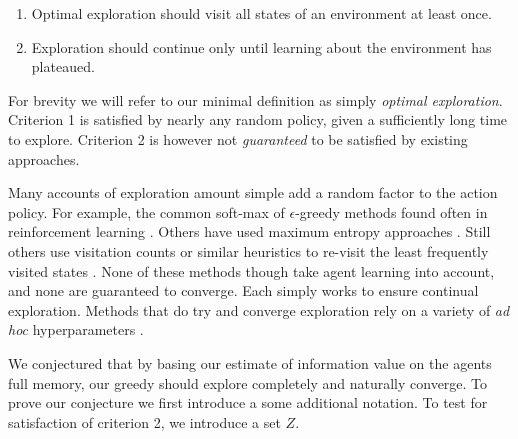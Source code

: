 \documentclass[9pt,twocolumn,twoside]{pnas-new}
\begin{document}
\begin{enumerate}[noitemsep,wide=0pt,leftmargin=\dimexpr\labelwidth+2\labelsep\relax]
    \item Optimal exploration should visit all states of an environment at least once. 
    \item Exploration should continue only until learning about the environment has plateaued. 
\end{enumerate}



For brevity we will refer to our minimal definition as simply \textit{optimal exploration}. Criterion 1 is satisfied by nearly any random policy, given a sufficiently long time to explore. Criterion 2 is however not \textit{guaranteed} to be satisfied by existing approaches.  

Many accounts of exploration amount simple add a random factor to the action policy. For example, the common soft-max of $\epsilon$-greedy methods found often in reinforcement learning \cite{Sutton2018a}. Others have used maximum entropy approaches \cite{Haarnoja2018,Haarnoja2015}. Still others use visitation counts or similar heuristics to re-visit the least frequently visited states \cite{Kulkarni2016,Sutton2018,Bellemare2016}. None of these methods though take agent learning into account, and none are guaranteed to converge. Each simply works to ensure continual exploration. Methods that do try and converge exploration rely on a variety of \textit{ad hoc} hyperparameters \cite{Sutton2018a}. 

We conjectured that by basing our estimate of information value on the agents full memory, our greedy should explore completely and naturally converge. To prove our conjecture we first introduce a some additional notation. To test for satisfaction of criterion 2, we introduce a set $Z$. 
\end{document}
